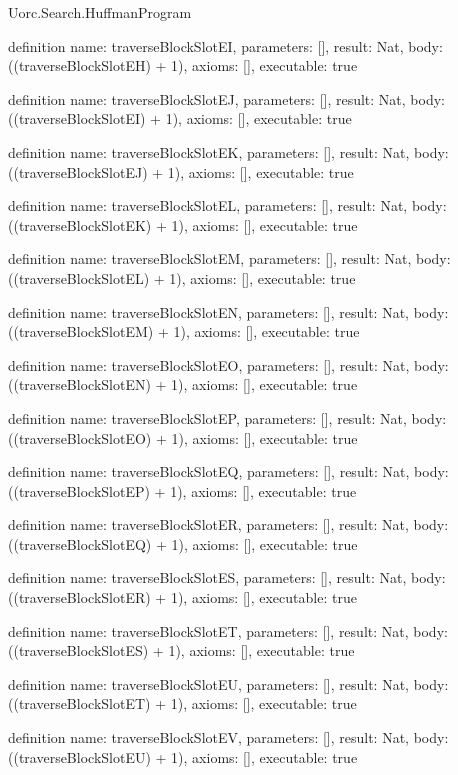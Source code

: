 \begin{lexlean}{Uorc.Search.HuffmanProgram}
\begin{semanticmodule}
definition{
  name: traverseBlockSlotEI,
  parameters: [],
  result: Nat,
  body: ((traverseBlockSlotEH) + 1),
  axioms: [],
  executable: true
}

definition{
  name: traverseBlockSlotEJ,
  parameters: [],
  result: Nat,
  body: ((traverseBlockSlotEI) + 1),
  axioms: [],
  executable: true
}

definition{
  name: traverseBlockSlotEK,
  parameters: [],
  result: Nat,
  body: ((traverseBlockSlotEJ) + 1),
  axioms: [],
  executable: true
}

definition{
  name: traverseBlockSlotEL,
  parameters: [],
  result: Nat,
  body: ((traverseBlockSlotEK) + 1),
  axioms: [],
  executable: true
}

definition{
  name: traverseBlockSlotEM,
  parameters: [],
  result: Nat,
  body: ((traverseBlockSlotEL) + 1),
  axioms: [],
  executable: true
}

definition{
  name: traverseBlockSlotEN,
  parameters: [],
  result: Nat,
  body: ((traverseBlockSlotEM) + 1),
  axioms: [],
  executable: true
}

definition{
  name: traverseBlockSlotEO,
  parameters: [],
  result: Nat,
  body: ((traverseBlockSlotEN) + 1),
  axioms: [],
  executable: true
}

definition{
  name: traverseBlockSlotEP,
  parameters: [],
  result: Nat,
  body: ((traverseBlockSlotEO) + 1),
  axioms: [],
  executable: true
}

definition{
  name: traverseBlockSlotEQ,
  parameters: [],
  result: Nat,
  body: ((traverseBlockSlotEP) + 1),
  axioms: [],
  executable: true
}

definition{
  name: traverseBlockSlotER,
  parameters: [],
  result: Nat,
  body: ((traverseBlockSlotEQ) + 1),
  axioms: [],
  executable: true
}

definition{
  name: traverseBlockSlotES,
  parameters: [],
  result: Nat,
  body: ((traverseBlockSlotER) + 1),
  axioms: [],
  executable: true
}

definition{
  name: traverseBlockSlotET,
  parameters: [],
  result: Nat,
  body: ((traverseBlockSlotES) + 1),
  axioms: [],
  executable: true
}

definition{
  name: traverseBlockSlotEU,
  parameters: [],
  result: Nat,
  body: ((traverseBlockSlotET) + 1),
  axioms: [],
  executable: true
}

definition{
  name: traverseBlockSlotEV,
  parameters: [],
  result: Nat,
  body: ((traverseBlockSlotEU) + 1),
  axioms: [],
  executable: true
}


\end{semanticmodule}
\end{lexlean}
